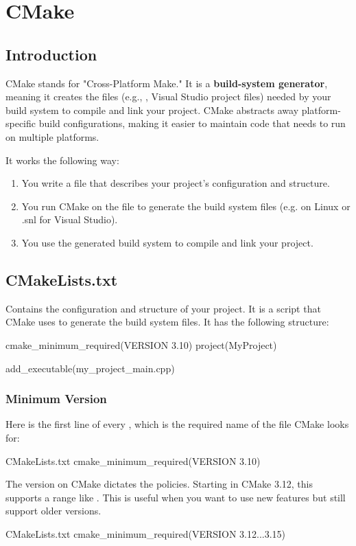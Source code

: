 \chapter{CMake}

\section{Introduction}

CMake stands for "Cross-Platform Make." It is a \textbf{build-system generator}, meaning it creates the files (e.g., , Visual Studio project files) needed by your build system to compile and link your project.
CMake abstracts away platform-specific build configurations, making it easier to maintain code that needs to run on multiple platforms.

It works the following way:
\begin{enumerate}
    \item You write a  file that describes your project's configuration and structure.
    \item You run CMake on the  file to generate the build system files (e.g.  on Linux or .snl for Visual Studio).
    \item You use the generated build system to compile and link your project.
\end{enumerate}

\section{CMakeLists.txt}

Contains the configuration and structure of your project. It is a script that CMake uses to generate the build system files.
It has the following structure:

\begin{neonlisting}[language=C++]{}
cmake_minimum_required(VERSION 3.10) 
project(MyProject)  

add_executable(my_project_main.cpp) 
\end{neonlisting}

\subsection{Minimum Version}

Here is the first line of every , which is the required name of the file CMake looks for:
\begin{neonlisting}{CMakeLists.txt}
    cmake_minimum_required(VERSION 3.10)
\end{neonlisting}
The version on CMake dictates the policies. Starting in CMake 3.12, this supports
a range like . This is useful when you want to use new features but still support older versions.
\begin{neonlisting}{CMakeLists.txt}
    cmake_minimum_required(VERSION 3.12...3.15)
\end{neonlisting}

